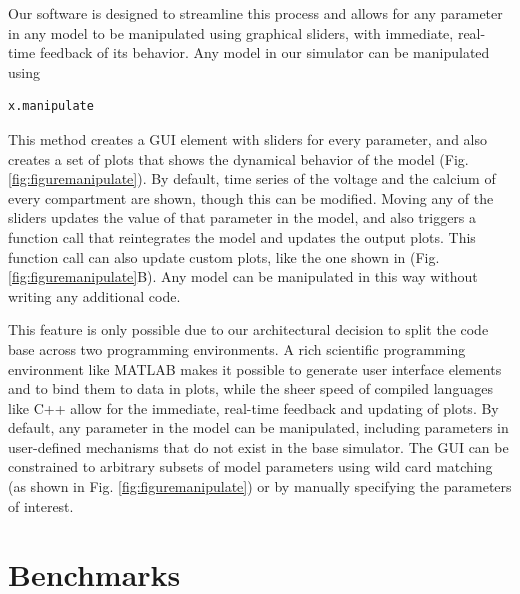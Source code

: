 \documentclass{frontiersSCNS} %
\begin{document}
Our software is designed to streamline this process and allows for any parameter in any model to be manipulated using graphical sliders, with immediate, real-time feedback of its behavior. Any model in our simulator can be manipulated using

\begin{lstlisting}[style=Matlab-editor]
x.manipulate 
\end{lstlisting}

This method creates a GUI element with sliders for every parameter, and also creates a set of plots that shows the dynamical behavior of the model (Fig. \ref{fig:figuremanipulate}). By default, time series of the voltage and the calcium of every compartment are shown, though this can be modified. Moving any of the sliders updates the value of that parameter in the model, and also triggers a function call that reintegrates the model and updates the output plots. This function call can also update custom plots, like the one shown in (Fig. \ref{fig:figuremanipulate}B). Any model can be manipulated in this way without writing any additional code. 

This feature is only possible due to our architectural decision to split the code base across two programming environments. A rich scientific programming environment like MATLAB makes it possible to generate user interface elements and to bind them to data in plots, while the sheer speed of compiled languages like C++ allow for the immediate, real-time feedback and updating of plots. By default, any parameter in the model can be manipulated, including parameters in user-defined mechanisms that do not exist in the base simulator. The GUI can be constrained to arbitrary subsets of model parameters using wild card matching (as shown in Fig. \ref{fig:figuremanipulate}) or by manually specifying the parameters of interest. 



%
%
%
%
%
%

\section{Benchmarks}
\label{benchmarks}
\end{document}
